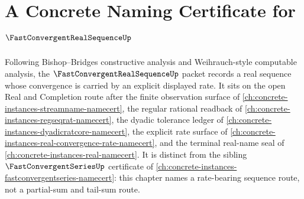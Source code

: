 \chapter{A Concrete Naming Certificate for $\FastConvergentRealSequenceUp$}
\label{ch:concrete-instances-fast-convergent-real-sequence-namecert}

Following Bishop--Bridges constructive analysis and Weihrauch-style computable analysis, the $\FastConvergentRealSequenceUp$ packet records a real sequence whose convergence is carried by an explicit displayed rate. It sits on the open Real and Completion route after the finite observation surface of \autoref{ch:concrete-instances-streamname-namecert}, the regular rational readback of \autoref{ch:concrete-instances-regseqrat-namecert}, the dyadic tolerance ledger of \autoref{ch:concrete-instances-dyadicratcore-namecert}, the explicit rate surface of \autoref{ch:concrete-instances-real-convergence-rate-namecert}, and the terminal real-name seal of \autoref{ch:concrete-instances-real-namecert}. It is distinct from the sibling $\FastConvergentSeriesUp$ certificate of \autoref{ch:concrete-instances-fastconvergentseries-namecert}: this chapter names a rate-bearing sequence route, not a partial-sum and tail-sum route.

